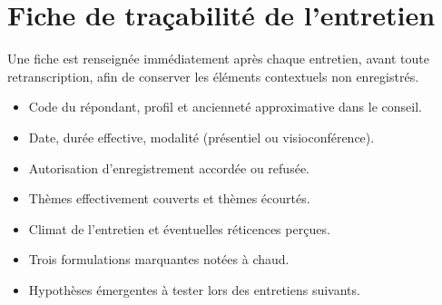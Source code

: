 \section{Fiche de traçabilité de l'entretien}

Une fiche est renseignée immédiatement après chaque entretien, avant toute
retranscription, afin de conserver les éléments contextuels non enregistrés.

\begin{itemize}
    \item Code du répondant, profil et ancienneté approximative dans le conseil.
    \item Date, durée effective, modalité (présentiel ou visioconférence).
    \item Autorisation d'enregistrement accordée ou refusée.
    \item Thèmes effectivement couverts et thèmes écourtés.
    \item Climat de l'entretien et éventuelles réticences perçues.
    \item Trois formulations marquantes notées à chaud.
    \item Hypothèses émergentes à tester lors des entretiens suivants.
\end{itemize}
